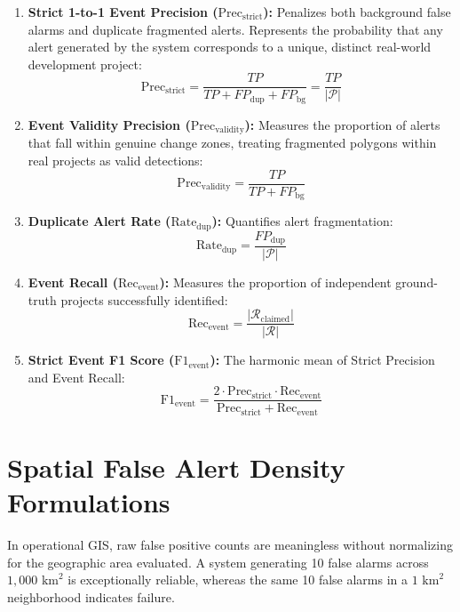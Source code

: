 \begin{enumerate}
    \item \textbf{Strict 1-to-1 Event Precision ($\text{Prec}_{\text{strict}}$):} Penalizes both background false alarms and duplicate fragmented alerts. Represents the probability that any alert generated by the system corresponds to a unique, distinct real-world development project:
    \begin{equation}
        \text{Prec}_{\text{strict}} = \frac{TP}{TP + FP_{\text{dup}} + FP_{\text{bg}}} = \frac{TP}{|\mathcal{P}|}
        \label{eq:strict_precision}
    \end{equation}
    \item \textbf{Event Validity Precision ($\text{Prec}_{\text{validity}}$):} Measures the proportion of alerts that fall within genuine change zones, treating fragmented polygons within real projects as valid detections:
    \begin{equation}
        \text{Prec}_{\text{validity}} = \frac{TP}{TP + FP_{\text{bg}}}
        \label{eq:validity_precision}
    \end{equation}
    \item \textbf{Duplicate Alert Rate ($\text{Rate}_{\text{dup}}$):} Quantifies alert fragmentation:
    \begin{equation}
        \text{Rate}_{\text{dup}} = \frac{FP_{\text{dup}}}{|\mathcal{P}|}
        \label{eq:duplicate_rate}
    \end{equation}
    \item \textbf{Event Recall ($\text{Rec}_{\text{event}}$):} Measures the proportion of independent ground-truth projects successfully identified:
    \begin{equation}
        \text{Rec}_{\text{event}} = \frac{|\mathcal{R}_{\text{claimed}}|}{|\mathcal{R}|}
        \label{eq:event_recall}
    \end{equation}
    \item \textbf{Strict Event F1 Score ($\text{F1}_{\text{event}}$):} The harmonic mean of Strict Precision and Event Recall:
    \begin{equation}
        \text{F1}_{\text{event}} = \frac{2 \cdot \text{Prec}_{\text{strict}} \cdot \text{Rec}_{\text{event}}}{\text{Prec}_{\text{strict}} + \text{Rec}_{\text{event}}}
        \label{eq:event_f1}
    \end{equation}
\end{enumerate}

\section{Spatial False Alert Density Formulations}
\label{sec:exp_alert_density}
In operational GIS, raw false positive counts are meaningless without normalizing for the geographic area evaluated. A system generating 10 false alarms across $1,000\text{ km}^2$ is exceptionally reliable, whereas the same 10 false alarms in a $1\text{ km}^2$ neighborhood indicates failure.


